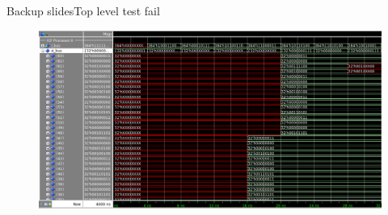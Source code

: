 \documentclass{beamer}
\begin{document}
\begin{frame}{Backup slides}{Top level test fail}
  \begin{figure}
    \begin{center}
      \includegraphics[height=0.6\textheight]{figs/top-fail}
    \end{center}
  \end{figure}
\end{frame}
\end{document}
